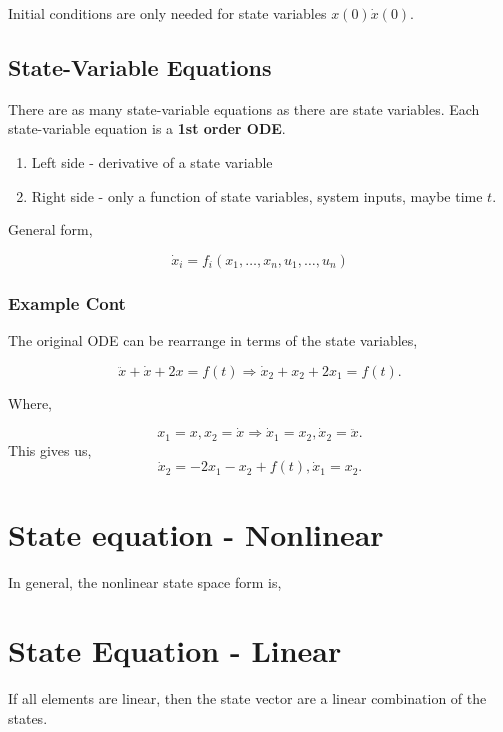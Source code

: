 \documentclass[12pt, a4paper]{report}
\begin{document}
  Initial conditions are only needed for state variables $ x(0) \dot x(0). $

  \subsection{State-Variable Equations}

  There are as many state-variable equations as there are state variables. Each state-variable equation is a \textbf{1st order ODE}.

  \begin{enumerate}
    \item Left side - derivative of a state variable
    \item Right side - only a function of state variables, system inputs, maybe time $ t. $
  \end{enumerate}

  General form,

  \begin{equation}
    \dot x_i = f_i(x_1, \ldots, x_n, u_1, \ldots, u_n)
  \end{equation}

  \subsubsection{Example Cont}

  The original ODE can be rearrange in terms of the state variables,

  \[
      \ddot x + \dot x + 2x = f(t) \Rightarrow \dot x_2 + x_2 + 2x_1 = f(t)
    .\]

  Where,

  \[
      x_1 = x, x_2 = \dot x \Rightarrow \dot x_1 = x_2, \dot x_2 = \ddot x
    .\]
  This gives us,
  \[
      \dot x_2 = -2x_1 - x_2 + f(t), \dot x_1 = x_2
    .\]

  \section{State equation - Nonlinear}

  In general, the nonlinear state space form is,

  \section{State Equation - Linear}

  If all elements are linear, then the state vector are a linear combination of the states.
\end{document}
